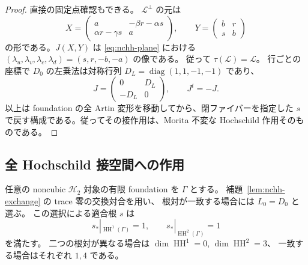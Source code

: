 \begin{proof}
直接の固定点確認もできる。
$\mathscr L^{\perp}$ の元は
\[
X=\begin{pmatrix}a&-\beta r-\alpha s\\\alpha r-\gamma s&a\end{pmatrix},\qquad
Y=\begin{pmatrix}b&r\\s&b\end{pmatrix}
\]
の形である。$J(X,Y)$ は \eqref{eq:nchh-plane} における
$(\lambda_u,\lambda_v,\lambda_c,\lambda_d)=(s,r,-b,-a)$ の像である。
従って $\tau(\mathscr L)=\mathscr L$。
行ごとの座標で $D_0$ の左乗法は対称行列
$D_L=\operatorname{diag}(1,1,-1,-1)$ であり、
\[
J=\begin{pmatrix}0&D_L\\-D_L&0\end{pmatrix},\qquad J^t=-J.
\]
以上は foundation の全 Artin 変形を移動してから、閉ファイバーを指定した
$s$ で戻す構成である。従ってその接作用は、Morita 不変な
Hochschild 作用そのものである。
\end{proof}

\subsection{全 Hochschild 接空間への作用}

\begin{theorem}\label{thm:noncubic-hh-trivial-root}
任意の noncubic $\mathcal H_2$ 対象の有限 foundation を $\Gamma$ とする。
補題~\ref{lem:nchh-exchange} の trace 零の交換対合を用い、
根対が一致する場合には $L_0=D_0$ と選ぶ。
この選択による適合根 $s$ は
\[
s_*|_{\operatorname{HH}^1(\Gamma)}=1,\qquad s_*|_{\operatorname{HH}^2(\Gamma)}=1
\]
を満たす。
二つの根対が異なる場合は $\dim\operatorname{HH}^1=0$, $\dim\operatorname{HH}^2=3$、
一致する場合はそれぞれ $1,4$ である。
\end{theorem}


